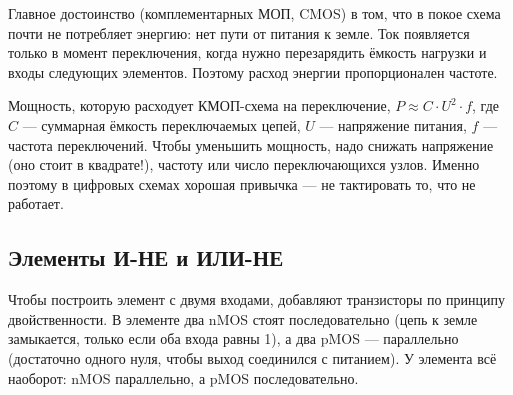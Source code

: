 Главное достоинство  (комплементарных МОП, CMOS) в том, что в
покое схема почти не потребляет энергию: нет пути от питания к земле. Ток
появляется только в момент переключения, когда нужно перезарядить
ёмкость нагрузки и входы следующих элементов. Поэтому расход энергии
пропорционален частоте.

\begin{ideabox}
Мощность, которую расходует КМОП-схема на переключение,
$P \approx C\cdot U^2\cdot f$, где $C$ --- суммарная ёмкость переключаемых
цепей, $U$ --- напряжение питания, $f$ --- частота переключений. Чтобы
уменьшить мощность, надо снижать напряжение (оно стоит в квадрате!),
частоту или число переключающихся узлов. Именно поэтому в цифровых схемах
хорошая привычка --- не тактировать то, что не работает.
\end{ideabox}

\subsection{Элементы И-НЕ и ИЛИ-НЕ}

Чтобы построить элемент с двумя входами, добавляют транзисторы
по принципу двойственности. В элементе  два nMOS стоят
последовательно (цепь к земле замыкается, только если оба входа равны 1), а
два pMOS --- параллельно (достаточно одного нуля, чтобы выход соединился с
питанием). У элемента  всё наоборот: nMOS параллельно, а pMOS
последовательно.

